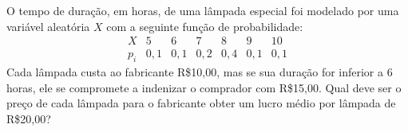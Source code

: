 %
%


\begin{exercicioBanco}[\valorquestao]
    O tempo de duração, em horas, de uma lâmpada especial foi modelado por uma variável aleatória \(X\) com a seguinte função de probabilidade:
     \[
        \begin{array}{c|c|c|c|c|c|c}
            X & 5 & 6 & 7 & 8 & 9 & 10 \\
            \hline
            p_{i} & 0,1 & 0,1 & 0,2 & 0,4 & 0,1 & 0,1
        \end{array}
    \]
    Cada lâmpada custa ao fabricante R\$10,00, mas se sua duração for inferior a \(6\) horas, ele se compromete a indenizar o comprador com R\$15,00. Qual deve ser o preço de cada lâmpada para o fabricante obter um lucro médio por lâmpada de R\$20,00?
\end{exercicioBanco}

